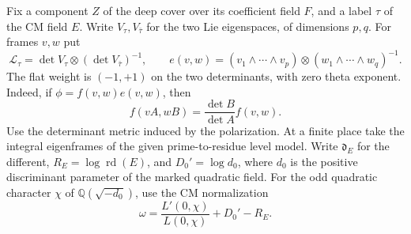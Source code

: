 \begin{paramdefinition}\label{hyp:flat-determinant-frames}
Fix a component \(Z\) of the deep cover over its coefficient field \(F\),
and a label \(\tau\) of the CM field \(E\). Write \(V_\tau,V_{\bar\tau}\)
for the two Lie eigenspaces, of dimensions \(p,q\). For frames \(v,w\) put
\[
 \mathcal L_\tau=\det V_\tau\otimes(\det V_{\bar\tau})^{-1},\qquad
 e(v,w)=(v_1\wedge\cdots\wedge v_p)\otimes
                      (w_1\wedge\cdots\wedge w_q)^{-1}.
\]
The flat weight is \((-1,+1)\) on the two determinants, with zero
theta exponent. Indeed, if \(\phi=f(v,w)e(v,w)\), then
\[
 f(vA,wB)=\frac{\det B}{\det A}f(v,w).
\]
Use the determinant metric induced by the polarization. At a finite
place take the integral eigenframes of the given prime-to-residue
level model. Write \(\mathfrak d_E\) for the different,
\(R_E=\log\operatorname{rd}(E)\), and \(D_0'=\log d_0\), where \(d_0\)
is the positive discriminant parameter of the marked quadratic field.
For the odd quadratic character \(\chi\) of \(\mathbb Q(\sqrt{-d_0})\),
use the CM normalization
\[
              \omega=\frac{L'(0,\chi)}{L(0,\chi)}+D_0'-R_E .
\]
\end{paramdefinition}

\begin{construction}
\caption{Archimedean norms and finite orders of the flat generator in Definition~\ref{hyp:flat-determinant-frames}. The finite correction converts the CM frame degree to the normalized degree of Proposition~\ref{prop:deep-flat-line-degree}.}\label{fig:flat-cm-frames}
\end{construction}

